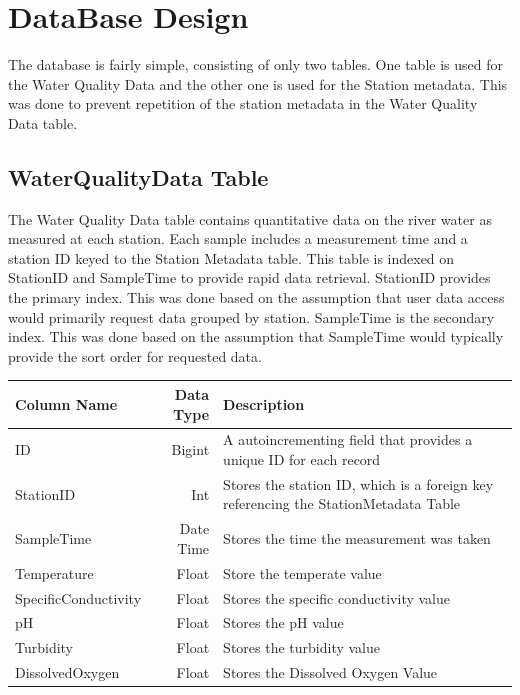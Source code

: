 \documentclass[a4paper]{article}
\begin{document}
\begin{minipage}[t]{0.45\textwidth}
\section*{DataBase Design}
The database is fairly simple, consisting of only two tables. One table is used for the Water Quality Data and the other one is used for the Station metadata. This was done to prevent repetition of the station metadata in the Water Quality Data table.
\subsection{WaterQualityData Table}
The Water Quality Data table contains quantitative data on the river water as measured at each station. Each sample includes a measurement time and a station ID keyed to the Station Metadata table. This table is indexed on StationID and SampleTime to provide rapid data retrieval. StationID provides the primary index. This was done based on the assumption that user data access would primarily request data grouped by station. SampleTime is the secondary index. This was done based on the assumption that SampleTime would typically provide the sort order for requested data.
\begin{center}
\begin{tabular} { | l | r | p{3.2cm} | }
\hline
{\scriptsize Column Name} & {\scriptsize Data Type} & {\scriptsize Description }\\
\hline
{\scriptsize ID} & {\scriptsize Bigint } & {\scriptsize A autoincrementing field that provides a unique ID for each record } \\
\hline
{\scriptsize StationID} & {\scriptsize Int} & {\scriptsize Stores the station ID, which is a foreign key referencing the StationMetadata Table} \\
\hline
{\scriptsize SampleTime} & {\scriptsize Date Time} & {\scriptsize Stores the time the measurement was taken}  \\
\hline
{\scriptsize Temperature} & {\scriptsize Float} & {\scriptsize Store the temperate value} \\
\hline
{\scriptsize SpecificConductivity} & {\scriptsize Float} & {\scriptsize Stores the specific conductivity value}\\
\hline
{\scriptsize pH} & {\scriptsize Float} & {\scriptsize Stores the pH value} \\
\hline
{\scriptsize Turbidity} & {\scriptsize Float} & {\scriptsize Stores the turbidity value} \\
\hline
{\scriptsize DissolvedOxygen} & {\scriptsize Float} & {\scriptsize Stores the Dissolved Oxygen Value} \\
\hline
\end{tabular}
\end{center}

\end{minipage}
\end{document}
